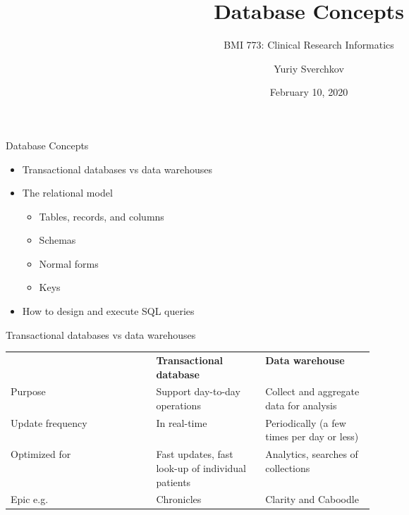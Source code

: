 \documentclass[aspectratio=169]{beamer}
\title{Database Concepts}
\subtitle{BMI 773: Clinical Research Informatics}
\author{Yuriy Sverchkov}
\institute{University of Wisconsin--Madison}
\date{February 10, 2020}
\begin{document}
	
	{
		\begin{frame}[plain]
			\vskip4cm
			\titlepage
		\end{frame}
	}

	\begin{frame}{Database Concepts}
		\begin{itemize}
			\item Transactional databases vs data warehouses
			\item The relational model
			\begin{itemize}
				\item Tables, records, and columns
				\item Schemas
				\item Normal forms
				\item Keys
			\end{itemize}
			\item How to design and execute SQL queries
		\end{itemize}
	\end{frame}

	\begin{frame}{Transactional databases vs data warehouses}
		\centering
		
		
		\begin{tabular}{lp{0.3\linewidth}p{0.3\linewidth}}
			& \textbf{Transactional database} & \textbf{Data warehouse} \\
			Purpose & Support day-to-day operations & Collect and aggregate data for analysis \\
			Update frequency & In real-time & Periodically (a few times per day or less) \\
			Optimized for & Fast updates, fast look-up of individual patients & Analytics, searches of collections \\
			Epic e.g. & Chronicles & Clarity and Caboodle
		\end{tabular}
		
	\end{frame}
\end{document}
